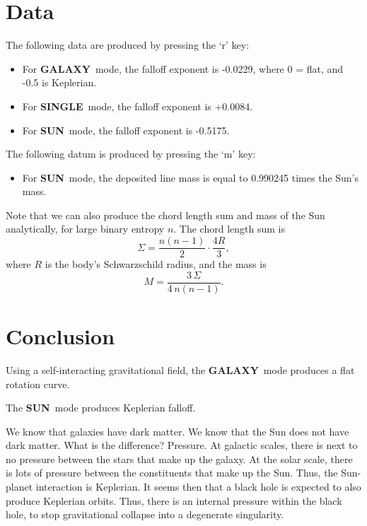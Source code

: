 \documentclass[12pt]{article}
\newcommand{\GALAXY}{\textcolor{galaxyc}{\textbf{\textsf{GALAXY}}}}
\newcommand{\SUN}{\textcolor{sunc}{\textbf{\textsf{SUN}}}}
\newcommand{\SINGLE}{\textbf{\textsf{SINGLE}}}
\begin{document}
\section{Data}

The following data are produced by pressing the `r' key:
\begin{itemize}
\item For \GALAXY\ mode, the falloff exponent is -0.0229, where 0 = flat, and -0.5 is Keplerian.
\item For \SINGLE\ mode, the falloff exponent is +0.0084.
\item For \SUN\ mode, the falloff exponent is -0.5175.
\end{itemize}

The following datum is produced by pressing the `m' key:
\begin{itemize}
\item For \SUN\ mode, the deposited line mass is equal to 0.990245 times the Sun's mass.
\end{itemize}
Note that we can also produce the chord length sum and mass of the Sun analytically, for large binary entropy $n$.
The chord length sum is
\begin{equation}
  \Sigma = \frac{n(n-1)}{2} \cdot \frac{4R}{3},
\end{equation}
where $R$ is the body's Schwarzschild radius,
and the mass is
\begin{equation}
M = \frac{3\,\Sigma}{4\, n(n-1)}.
\end{equation}


\section{Conclusion}
Using a self-interacting gravitational field, the \GALAXY\ mode produces a flat rotation curve.

The \SUN\ mode produces Keplerian falloff.

We know that galaxies have dark matter. 
We know that the Sun does not have dark matter. 
What is the difference? 
Pressure. 
At galactic scales, there is next to no pressure between the stars that make up the galaxy. 
At the solar scale, there is lots of pressure between the constituents that make up the Sun. 
Thus, the Sun-planet interaction is Keplerian. 
It seems then that a black hole is expected to also produce Keplerian orbits. 
Thus, there is an internal pressure within the black hole, to stop gravitational collapse into a degenerate singularity.
\end{document}

